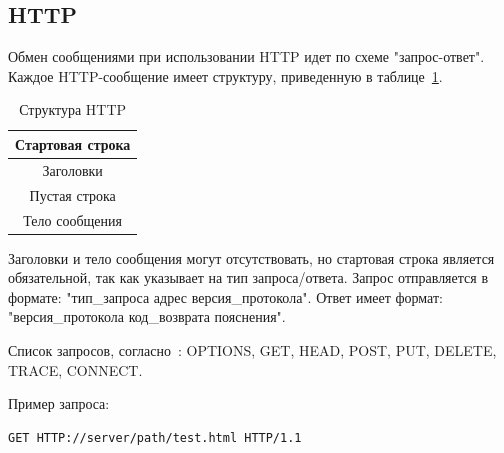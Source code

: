 \subsection{HTTP}
Обмен сообщениями при использовании HTTP идет по схеме "запрос-ответ". Каждое HTTP-сообщение имеет структуру, приведенную в таблице~\ref{tbl:http_structure}.
\begin{table}
\centering
\caption{Структура HTTP}
\label{tbl:http_structure}
\begin{tabular} {| c |} 
\hline
Стартовая строка\\
\hline
Заголовки\\
\hline
Пустая строка\\
\hline
Тело сообщения\\
\hline
\end{tabular}
\end{table}

Заголовки и тело сообщения могут отсутствовать, но стартовая строка является обязательной, так как указывает на тип запроса/ответа. Запрос отправляется в формате: "тип\_запроса адрес версия\_протокола". Ответ имеет формат: "версия\_протокола код\_возврата пояснения".

Список запросов, согласно~\cite{http_rfc}: OPTIONS, GET, HEAD, POST, PUT, DELETE, TRACE, CONNECT.

Пример запроса:
\begin{lstlisting}
GET HTTP://server/path/test.html HTTP/1.1
\end{lstlisting}


